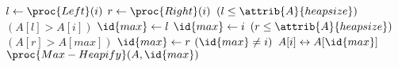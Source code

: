 \begin{codebox}
\li $l \gets \proc{Left}(i)$
\li $r \gets \proc{Right}(i)$
\li \If $(l \leq \attrib{A}{heapsize})$ \And $(A[l] > A[i])$
\li	\Then
		$\id{max} \gets l$
\li	\Else 
\li		$\id{max} \gets i$			
	\End
\li \If $(r \leq \attrib{A}{heapsize})$ \And $(A[r] > A[max])$
\li \Then
		$\id{max} \gets r$
	\End
\li \If $(\id{max} \neq i)$
\li \Then 
		$A[i] \leftrightarrow A[\id{max}]$
\li		$\proc{Max-Heapify}(A,\id{max})$
	\End
\end{codebox}